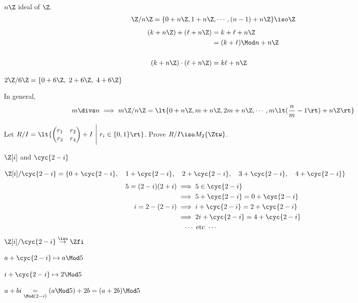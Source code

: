 \begin{example}
  \( n\Z \) ideal of \( \Z. \)
  \begin{align*}
    \Z/n\Z = \{0+n\Z, 1+n\Z, \cdots, (n-1)+n\Z\} \iso \Z
  \end{align*}\begin{align*}
    (k+n\Z)+(\ell +n\Z) &= k + \ell + n\Z \\
    &= (k+\ell)\Mod n  + n\Z \\\\
    (k+n\Z)\cdot(\ell +n\Z) &= k\ell + n\Z
  \end{align*}
\end{example}

\begin{example}
  \( 2\Z/6\Z = \{0+6\Z,\ 2+6\Z,\ 4+6\Z\} \)
\end{example}

\begin{note}
  In general,
  \begin{align*}
    m\divs n \implies m\Z/n\Z = \lt\{0+n\Z, m+n\Z, 2m+n\Z, \cdots, m\lt(\frac{n}{m}-1\rt)+n\Z \rt\}
  \end{align*}
\end{note}


\begin{exercise}
  Let \( R/I = \lt\{ \begin{pmatrix}
    r_1 & r_2 \\ r_3 & r_4
  \end{pmatrix} + I  \ \Bigg|\  r_i\in \{ 0,1 \}\rt\} \). Prove \( R/I\iso M_2\{\Ztw\} \).
\end{exercise}

\begin{example}[\( \bigstar \)] \( \Z[i] \) and \( \cyc{2-i} \)

\( \Z[i] /\cyc{2-i} = \{ 0+\cyc{2-i},\quad 1+\cyc{2-i},\quad 2+\cyc{2-i},\quad 3+\cyc{2-i},\quad 4+\cyc{2-i}\} \)
  \begin{align*}
    5 = (2-i)(2+i) &\implies 5\in\cyc{2-i} \\
                   &\implies 5 + \cyc{2-i} = 0+\cyc{2-i} \\
    i = 2-(2-i)    &\implies i +\cyc{2-i} = 2+\cyc{2-i} \\
                   &\implies 2i+\cyc{2-i} = 4+\cyc{2-i} \\
                   &\quad \cdots \text{ etc } \cdots
  \end{align*}
\( \Z[i]/\cyc{2-i} \overset{\iso}{\to} \Zfi \)

\( a+\cyc{2-i} \mapsto a\Mod 5 \)

\( i+\cyc{2-i} \mapsto 2\Mod 5 \)

\( a+bi \underset{\Mod (2-i)}{=} (a\Mod 5) + 2b = (a+2b)\Mod 5 \)
\end{example}

